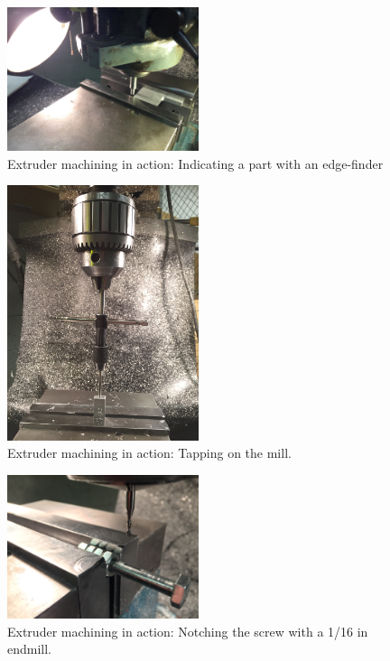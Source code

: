 
\indent

\begin{figure}[h!]
\centering
\includegraphics[width=0.5\textwidth]{./figures/extruder-edge-finder}
\caption{Extruder machining in action: Indicating a part with an edge-finder}
\label{fig:extruder-edge-finder}
\end{figure}

\begin{figure}[h!]
\centering
\includegraphics[width=0.5\textwidth]{./figures/extruder-tap}
\caption{Extruder machining in action: Tapping on the mill.}
\label{fig:extruder-tap}
\end{figure}

\begin{figure}[h!]
\centering
\includegraphics[width=0.5\textwidth]{./figures/extruder-screw-mill}
\caption{Extruder machining in action: Notching the screw with a 1/16 in endmill.}
\label{fig:extruder-screw-mill}
\end{figure}

